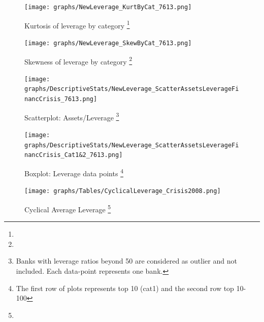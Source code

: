 \documentclass[12pt, a4paper]{article} %
\begin{document}
\begin{figure}[hbtp]
\begin{minipage}{\textwidth}
\centering
\caption[1]{Kurtosis of leverage by category \footnote{}}
\texttt{[image: graphs/NewLeverage\_KurtByCat\_7613.png]}
\label{fig:averageLeverage_kurt_Categories}
\end{minipage}
\end{figure}

\begin{figure}[hbtp]
\begin{minipage}{\textwidth}
\centering
\caption[1]{Skewness of leverage by category \footnote{}}
\texttt{[image: graphs/NewLeverage\_SkewByCat\_7613.png]}
\label{fig:averageLeverage_skew_Categories}
\end{minipage}
\end{figure}

\begin{figure}[hbtp]
\begin{minipage}{\textwidth}
\centering
\caption[1]{Scatterplot: Assets/Leverage \footnote{Banks with leverage ratios beyond 50 are considered as outlier and not included. Each data-point represents one bank. }}
\texttt{[image: graphs/DescriptiveStats/NewLeverage\_ScatterAssetsLeverageFinancCrisis\_7613.png]}
\label{fig:AssetsvsLeverageFinancCrisis}
\end{minipage}
\end{figure}

\begin{figure}[hbtp]
\begin{minipage}{\textwidth}
\centering
\caption[1]{Boxplot: Leverage data points \footnote{The first row of plots represents top 10 (cat1) and the second row top 10-100}}
\texttt{[image: graphs/DescriptiveStats/NewLeverage\_ScatterAssetsLeverageFinancCrisis\_Cat1\&2\_7613.png]}
\label{fig:BoxplotLeverageDatapointsFinancCrisis}
\end{minipage}
\end{figure}

\begin{figure}[hbtp]
\begin{minipage}{\textwidth}
\centering
\caption[1]{Cyclical Average Leverage \footnote{}}
\texttt{[image: graphs/Tables/CyclicalLeverage\_Crisis2008.png]}
\label{table:CyclicalLeverageFinancCrisis}
\end{minipage}
\end{figure}

\end{document}
